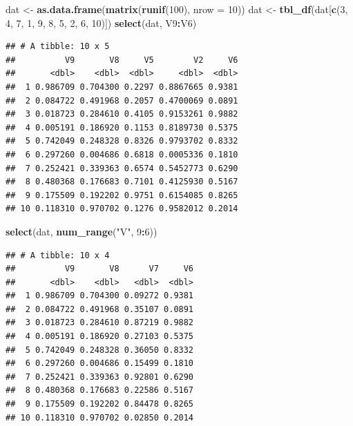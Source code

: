 \documentclass[]{book}
\newenvironment{Shaded}{\begin{snugshade}}{\end{snugshade}}
\newcommand{\KeywordTok}[1]{\textcolor[rgb]{0.13,0.29,0.53}{\textbf{#1}}}
\newcommand{\DataTypeTok}[1]{\textcolor[rgb]{0.13,0.29,0.53}{#1}}
\newcommand{\DecValTok}[1]{\textcolor[rgb]{0.00,0.00,0.81}{#1}}
\newcommand{\StringTok}[1]{\textcolor[rgb]{0.31,0.60,0.02}{#1}}
\newcommand{\OperatorTok}[1]{\textcolor[rgb]{0.81,0.36,0.00}{\textbf{#1}}}
\newcommand{\NormalTok}[1]{#1}
\begin{document}
\begin{Shaded}
\begin{Highlighting}[]
\NormalTok{dat <-}\StringTok{ }\KeywordTok{as.data.frame}\NormalTok{(}\KeywordTok{matrix}\NormalTok{(}\KeywordTok{runif}\NormalTok{(}\DecValTok{100}\NormalTok{), }\DataTypeTok{nrow =} \DecValTok{10}\NormalTok{))}
\NormalTok{dat <-}\StringTok{ }\KeywordTok{tbl_df}\NormalTok{(dat[}\KeywordTok{c}\NormalTok{(}\DecValTok{3}\NormalTok{, }\DecValTok{4}\NormalTok{, }\DecValTok{7}\NormalTok{, }\DecValTok{1}\NormalTok{, }\DecValTok{9}\NormalTok{, }\DecValTok{8}\NormalTok{, }\DecValTok{5}\NormalTok{, }\DecValTok{2}\NormalTok{, }\DecValTok{6}\NormalTok{, }\DecValTok{10}\NormalTok{)])}
\KeywordTok{select}\NormalTok{(dat, V9}\OperatorTok{:}\NormalTok{V6)}
\end{Highlighting}
\end{Shaded}

\begin{verbatim}
## # A tibble: 10 x 5
##          V9       V8     V5        V2     V6
##       <dbl>    <dbl>  <dbl>     <dbl>  <dbl>
##  1 0.986709 0.704300 0.2297 0.8867665 0.9381
##  2 0.084722 0.491968 0.2057 0.4700069 0.0891
##  3 0.018723 0.284610 0.4105 0.9153261 0.9882
##  4 0.005191 0.186920 0.1153 0.8189730 0.5375
##  5 0.742049 0.248328 0.8326 0.9793702 0.8332
##  6 0.297260 0.004686 0.6818 0.0005336 0.1810
##  7 0.252421 0.339363 0.6574 0.5452773 0.6290
##  8 0.480368 0.176683 0.7101 0.4125930 0.5167
##  9 0.175509 0.192202 0.9751 0.6154085 0.8265
## 10 0.118310 0.970702 0.1276 0.9582012 0.2014
\end{verbatim}

\begin{Shaded}
\begin{Highlighting}[]
\KeywordTok{select}\NormalTok{(dat, }\KeywordTok{num_range}\NormalTok{(}\StringTok{"V"}\NormalTok{, }\DecValTok{9}\OperatorTok{:}\DecValTok{6}\NormalTok{))}
\end{Highlighting}
\end{Shaded}

\begin{verbatim}
## # A tibble: 10 x 4
##          V9       V8      V7     V6
##       <dbl>    <dbl>   <dbl>  <dbl>
##  1 0.986709 0.704300 0.09272 0.9381
##  2 0.084722 0.491968 0.35107 0.0891
##  3 0.018723 0.284610 0.87219 0.9882
##  4 0.005191 0.186920 0.27103 0.5375
##  5 0.742049 0.248328 0.36050 0.8332
##  6 0.297260 0.004686 0.15499 0.1810
##  7 0.252421 0.339363 0.92801 0.6290
##  8 0.480368 0.176683 0.22586 0.5167
##  9 0.175509 0.192202 0.84478 0.8265
## 10 0.118310 0.970702 0.02850 0.2014
\end{verbatim}
\end{document}
